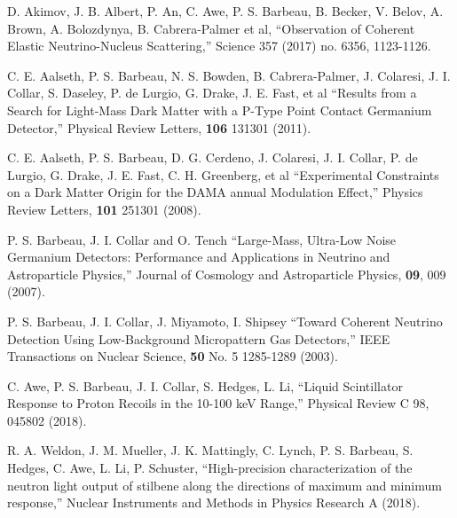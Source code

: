 \documentclass[12pt]{article}
\begin{document}
\begin{list}{}{
        \setlength{\itemindent}{-0.2in}
        \setlength{\itemsep}{0.0in}
        \setlength{\leftmargin}{0.2in}
        \setlength{\parsep}{0.0in}
        }



  \item  D. Akimov, J. B. Albert, P. An, C. Awe, P. S. Barbeau, B. Becker, V. Belov, A. Brown, A. Bolozdynya, B. Cabrera-Palmer et al, ``Observation of Coherent Elastic Neutrino-Nucleus Scattering,'' Science 357 (2017) no. 6356, 1123-1126. %
  \\
  
  \item C. E. Aalseth, P. S. Barbeau, N. S. Bowden, B. Cabrera-Palmer, J. Colaresi, J. I. Collar, S. Daseley, P. de Lurgio, G. Drake, J. E. Fast, et al ``Results from a Search for Light-Mass Dark Matter with a P-Type Point Contact Germanium Detector,'' Physical Review Letters, \textbf{106} 131301 (2011).
  \\

\item C. E. Aalseth, P. S. Barbeau, D. G. Cerdeno, J. Colaresi, J. I. Collar, P. de Lurgio, G. Drake, J. E. Fast, C. H. Greenberg, et al ``Experimental Constraints on a Dark Matter Origin for the DAMA annual Modulation Effect,'' Physics Review Letters, \textbf{101} 251301 (2008). 
  \\
  
  \item P. S. Barbeau, J. I. Collar and O. Tench ``Large-Mass, Ultra-Low Noise Germanium Detectors: Performance and Applications in Neutrino and Astroparticle Physics,'' Journal of Cosmology and Astroparticle Physics, \textbf{09}, 009 (2007). 
  \\
  
  \item P. S. Barbeau, J. I. Collar, J. Miyamoto, I. Shipsey ``Toward Coherent Neutrino Detection Using Low-Background Micropattern Gas Detectors,'' IEEE Transactions on Nuclear Science, \textbf{50} No. 5 1285-1289 (2003).
  \\
  
  
  \item  C. Awe, P. S. Barbeau, J. I. Collar, S. Hedges, L. Li, ``Liquid Scintillator Response to Proton Recoils in the 10-100 keV Range,'' Physical Review C 98, 045802 (2018).
  \\
  
  \item R. A. Weldon, J. M. Mueller, J. K. Mattingly, C. Lynch, P. S. Barbeau, S. Hedges, C. Awe, L. Li, P. Schuster, ``High-precision characterization of the neutron light output of stilbene along the directions of maximum and minimum response,'' Nuclear Instruments and Methods in Physics Research A (2018). 
\\


\end{list}
\end{document}
